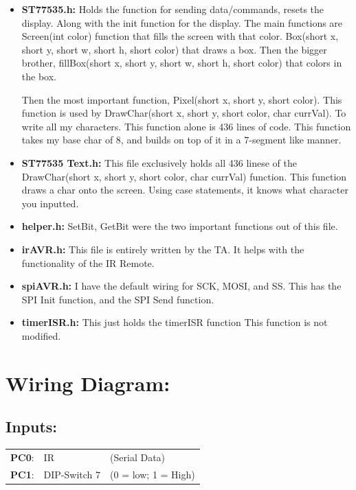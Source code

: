 \documentclass[12pt]{article}
\begin{document}
\begin{itemize}
  \item \textbf{ST77535.h:}
      Holds the function for sending data/commands, resets the display.
      Along with the init function for the display. The main functions are
      Screen(int color) function that fills the screen with that color.
Box(short x, short y, short w, short h, short color) that draws a box.
Then the bigger brother, fillBox(short x, short y, short w, short h, short color)
that colors in the box.


Then the most important function, Pixel(short x, short y, short color).
This function is used by DrawChar(short x, short y, short color, char currVal).
To write all my characters. This function alone is 436 lines of code.
This function takes my base char of 8, and builds on top of it in a 7-segment like manner.
  \item \textbf{ST77535 Text.h:}
    This file exclusively holds all 436 linese of
    the DrawChar(short x, short y, short color, char currVal) function.
    This function draws a char onto the screen. Using case statements, it
    knows what character you inputted.
  \item \textbf{helper.h:} SetBit, GetBit were the two important
    functions out of this file.
  \item \textbf{irAVR.h:} This file is entirely
    written by the TA. It helps with the functionality of the IR Remote.
  \item\textbf{spiAVR.h:}
    I have the default wiring for SCK, MOSI, and SS.
    This has the SPI Init function, and the SPI Send function.
  \item\textbf{timerISR.h:}
    This just holds the timerISR function
    This function is not modified.
\end{itemize}

\section{Wiring Diagram:}

\subsection*{Inputs:}
\begin{tabular}{ l l l }
   \textbf{PC0}: & IR & \quad (Serial Data) \\
   \textbf{PC1}: & DIP-Switch 7 & \quad (0 = low; 1 = High) \\
\end{tabular}
\end{document}
